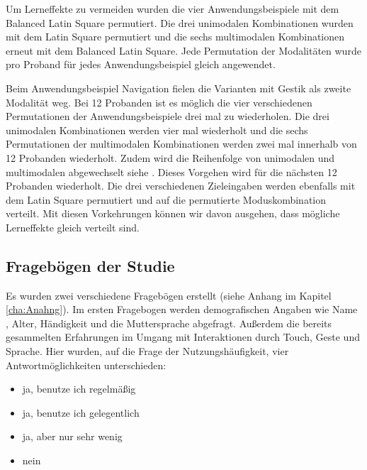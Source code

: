 Um Lerneffekte zu vermeiden wurden die vier Anwendungsbeispiele mit dem Balanced Latin Square permutiert. 
Die drei unimodalen Kombinationen wurden mit dem Latin Square permutiert und die sechs multimodalen Kombinationen erneut mit dem Balanced Latin Square. 
Jede Permutation der Modalitäten wurde pro Proband für jedes Anwendungsbeispiel gleich angewendet. 

Beim Anwendungsbeispiel Navigation fielen die Varianten mit Gestik als zweite Modalität weg. 
Bei 12 Probanden ist es möglich die vier verschiedenen Permutationen der Anwendungsbeispiele drei mal zu wiederholen. 
Die drei unimodalen Kombinationen werden vier mal wiederholt und die sechs Permutationen der multimodalen Kombinationen werden zwei mal innerhalb von 12 Probanden wiederholt. 
Zudem wird die Reihenfolge von unimodalen und multimodalen abgewechselt siehe . 
Dieses Vorgehen wird für die nächsten 12 Probanden wiederholt. 
Die drei verschiedenen Zieleingaben werden ebenfalls mit dem Latin Square permutiert und auf die permutierte Moduskombination verteilt. 
Mit diesen Vorkehrungen können wir davon ausgehen, dass mögliche Lerneffekte gleich verteilt sind.   
\subsection[Fragebögen]{Fragebögen der Studie}
Es wurden zwei verschiedene Fragebögen erstellt (siehe Anhang im Kapitel \ref{cha:Anahng}). 
Im ersten Fragebogen werden demografischen Angaben wie Name , Alter, Händigkeit und die Muttersprache abgefragt. 
Außerdem die bereits gesammelten Erfahrungen im Umgang mit Interaktionen durch Touch, Geste und Sprache. 
Hier wurden, auf die Frage der Nutzungshäufigkeit, vier Antwortmöglichkeiten unterschieden:
\begin{itemize}
	\item ja, benutze ich regelmäßig 
	\item ja, benutze ich gelegentlich
	\item ja, aber nur sehr wenig
	\item nein
\end{itemize}

